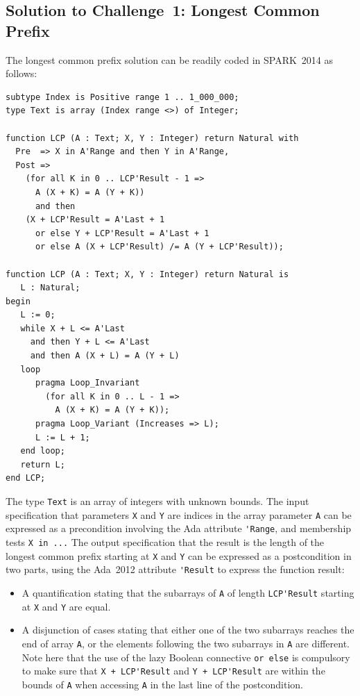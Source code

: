 \documentclass[sttt,final]{svjour}
\newcommand{\newspark}{SPARK~2014\xspace}
\newcommand{\adatwtw}{Ada~2012\xspace}
\begin{document}
\subsection{Solution to Challenge~1: Longest Common Prefix}
The longest common prefix solution can be readily coded in \newspark
as follows:
%
\begin{lstlisting}
subtype Index is Positive range 1 .. 1_000_000;
type Text is array (Index range <>) of Integer;

function LCP (A : Text; X, Y : Integer) return Natural with
  Pre  => X in A'Range and then Y in A'Range,
  Post =>
    (for all K in 0 .. LCP'Result - 1 =>
      A (X + K) = A (Y + K))
      and then
    (X + LCP'Result = A'Last + 1
      or else Y + LCP'Result = A'Last + 1
      or else A (X + LCP'Result) /= A (Y + LCP'Result));

function LCP (A : Text; X, Y : Integer) return Natural is
   L : Natural;
begin
   L := 0;
   while X + L <= A'Last
     and then Y + L <= A'Last
     and then A (X + L) = A (Y + L)
   loop
      pragma Loop_Invariant
        (for all K in 0 .. L - 1 =>
          A (X + K) = A (Y + K));
      pragma Loop_Variant (Increases => L);
      L := L + 1;
   end loop;
   return L;
end LCP;
\end{lstlisting}

The type \verb|Text| is an array of integers with unknown bounds. The input
specification that parameters \verb|X| and \verb|Y| are indices in the array
parameter \verb|A| can be expressed as a precondition involving the Ada
attribute \verb|'Range|, and membership tests \verb|X in ...| The output
specification that the result is the length of the longest common prefix
starting at \verb|X| and \verb|Y| can be expressed as a postcondition in two
parts, using the \adatwtw attribute \verb|'Result| to express the function
result:
\begin{itemize}
\item A quantification stating that the subarrays of \verb|A| of length
  \verb|LCP'Result| starting at \verb|X| and \verb|Y| are equal.
\item A disjunction of cases stating that either one of the two
  subarrays reaches the end of array \verb|A|, or the elements
  following the two subarrays in \verb|A| are different. Note here
  that the use of the lazy Boolean connective \verb|or else| is
  compulsory to make sure that \verb|X + LCP'Result| and
  \verb|Y + LCP'Result| are within the bounds of \verb|A| when
  accessing \verb|A| in the last line of the postcondition.
\end{itemize}
\end{document}
